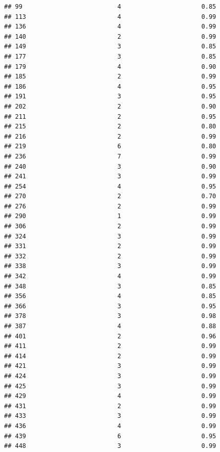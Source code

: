 \documentclass[
]{article}
\begin{document}
\begin{verbatim}
## 99                          4                      0.85
## 113                         4                      0.99
## 136                         4                      0.99
## 140                         2                      0.99
## 149                         3                      0.85
## 177                         3                      0.85
## 179                         4                      0.90
## 185                         2                      0.99
## 186                         4                      0.95
## 191                         3                      0.95
## 202                         2                      0.90
## 211                         2                      0.95
## 215                         2                      0.80
## 216                         2                      0.99
## 219                         6                      0.80
## 236                         7                      0.99
## 240                         3                      0.90
## 241                         3                      0.99
## 254                         4                      0.95
## 270                         2                      0.70
## 276                         2                      0.99
## 290                         1                      0.99
## 306                         2                      0.99
## 324                         3                      0.99
## 331                         2                      0.99
## 332                         2                      0.99
## 338                         3                      0.99
## 342                         4                      0.99
## 348                         3                      0.85
## 356                         4                      0.85
## 366                         3                      0.95
## 378                         3                      0.98
## 387                         4                      0.88
## 401                         2                      0.96
## 411                         2                      0.99
## 414                         2                      0.99
## 421                         3                      0.99
## 424                         3                      0.99
## 425                         3                      0.99
## 429                         4                      0.99
## 431                         2                      0.99
## 433                         3                      0.99
## 436                         4                      0.99
## 439                         6                      0.95
## 448                         3                      0.99

\end{verbatim}
\end{document}
